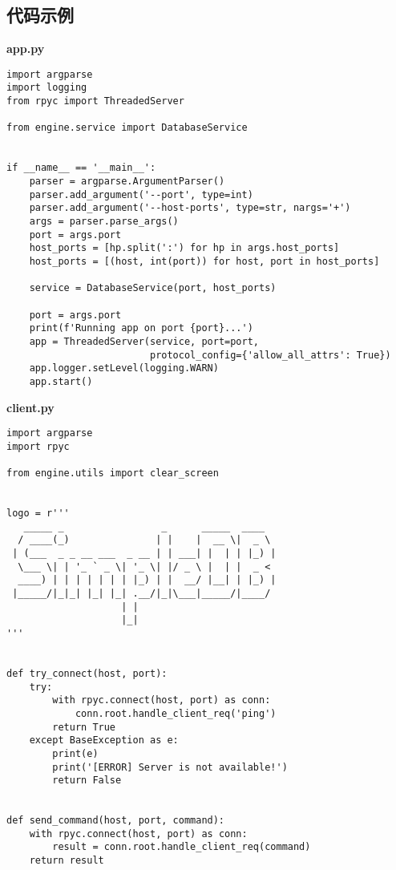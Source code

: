 \begin{appendix}

\section{代码示例}

\textbf{app.py}

\begin{lstlisting}
import argparse
import logging
from rpyc import ThreadedServer

from engine.service import DatabaseService


if __name__ == '__main__':    
    parser = argparse.ArgumentParser()
    parser.add_argument('--port', type=int)
    parser.add_argument('--host-ports', type=str, nargs='+')
    args = parser.parse_args()
    port = args.port
    host_ports = [hp.split(':') for hp in args.host_ports]
    host_ports = [(host, int(port)) for host, port in host_ports]
    
    service = DatabaseService(port, host_ports)

    port = args.port
    print(f'Running app on port {port}...')
    app = ThreadedServer(service, port=port, 
                         protocol_config={'allow_all_attrs': True})
    app.logger.setLevel(logging.WARN)
    app.start()
\end{lstlisting}

\textbf{client.py}

\begin{lstlisting}
import argparse
import rpyc

from engine.utils import clear_screen


logo = r''' 
   _____ _                 _      _____  ____  
  / ____(_)               | |    |  __ \|  _ \ 
 | (___  _ _ __ ___  _ __ | | ___| |  | | |_) |
  \___ \| | '_ ` _ \| '_ \| |/ _ \ |  | |  _ < 
  ____) | | | | | | | |_) | |  __/ |__| | |_) |
 |_____/|_|_| |_| |_| .__/|_|\___|_____/|____/ 
                    | |                        
                    |_|                        
'''


def try_connect(host, port):
    try:
        with rpyc.connect(host, port) as conn:
            conn.root.handle_client_req('ping')
        return True
    except BaseException as e:
        print(e)
        print('[ERROR] Server is not available!')
        return False


def send_command(host, port, command):
    with rpyc.connect(host, port) as conn:
        result = conn.root.handle_client_req(command)
    return result



\end{lstlisting}
\end{appendix}
